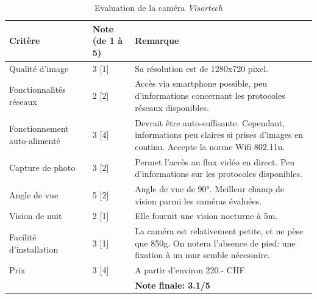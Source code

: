 \begin{table}[H]
    \centering
    \caption{Evaluation de la caméra \textit{Visortech}}
    \label{tab:visortech_eval}
    \begin{tabular}{@{}llp{8cm}@{}}
        \toprule
        Critère                      & Note (de 1 à 5) & Remarque                          \\ \midrule
        Qualité d'image              & 3 {[}1{]}       & Sa résolution est de 1280x720 pixel.                                                                                                  \\ [0.8ex]
        Fonctionnalités réseaux      & 2 {[}2{]}       & Accès via smartphone possible, peu d'informations concernant les protocoles réseaux disponibles.                                      \\ [0.8ex]
        Fonctionnement auto-alimenté & 3 {[}4{]}       & Devrait être auto-suffisante. Cependant, informations peu claires si prises d'images en continu. Accepte la norme Wifi 802.11n. \\ [0.8ex]
        Capture de photo             & 3 {[}2{]}       & Permet l'accès au flux vidéo en direct. Peu d'informations sur les protocoles disponibles.                                            \\ [0.8ex]
        Angle de vue                 & 5 {[}2{]}       & Angle de vue de 90°. Meilleur champ de vision parmi les caméras évaluées.                                                              \\ [0.8ex]
        Vision de nuit               & 2 {[}1{]}       & Elle fournit une vision nocturne à 5m.                                                                                                \\ [0.8ex]
        Facilité d'installation      & 3 {[}1{]}       & La caméra est relativement petite, et ne pèse que 850g. On notera l'absence de pied: une fixation à un mur semble nécessaire.         \\ [0.8ex]
        Prix                         & 3 {[}4{]}       & A partir d'environ 220.- CHF                                                                                                          \\ [0.8ex]
                                    &                 & \textbf{Note finale: 3.1/5} \\ \bottomrule
    \end{tabular}
\end{table}

